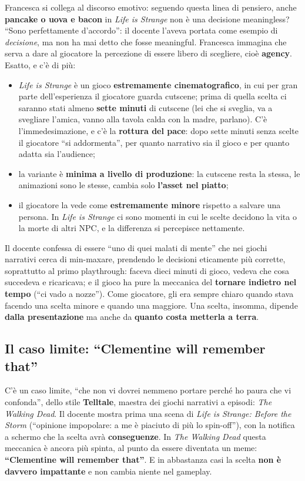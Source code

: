 Francesca si collega al discorso emotivo: seguendo questa linea di pensiero,
anche \textbf{pancake o uova e bacon} in \emph{Life is Strange} non è una
decisione meaningless? ``Sono perfettamente d'accordo'': il docente l'aveva
portata come esempio di \emph{decisione}, ma non ha mai detto che fosse
meaningful. Francesca immagina che serva a dare al giocatore la percezione di
essere libero di scegliere, cioè \textbf{agency}. Esatto, e c'è di più:
\begin{itemize}
  \item \emph{Life is Strange} è un gioco \textbf{estremamente
        cinematografico}, in cui per gran parte dell'esperienza il giocatore
        guarda cutscene; prima di quella scelta ci saranno stati almeno
        \textbf{sette minuti} di cutscene (lei che si sveglia, va a svegliare
        l'amica, vanno alla tavola calda con la madre, parlano). C'è
        l'immedesimazione, e c'è la \textbf{rottura del pace}: dopo sette
        minuti senza scelte il giocatore ``si addormenta'', per quanto
        narrativo sia il gioco e per quanto adatta sia l'audience;
  \item la variante è \textbf{minima a livello di produzione}: la cutscene
        resta la stessa, le animazioni sono le stesse, cambia solo
        \textbf{l'asset nel piatto};
  \item il giocatore la vede come \textbf{estremamente minore} rispetto a
        salvare una persona. In \emph{Life is Strange} ci sono momenti in
        cui le scelte decidono la vita o la morte di altri NPC, e la
        differenza si percepisce nettamente.
\end{itemize}
Il docente confessa di essere ``uno di quei malati di mente'' che nei giochi
narrativi cerca di min-maxare, prendendo le decisioni eticamente più
corrette, soprattutto al primo playthrough: faceva dieci minuti di gioco,
vedeva che cosa succedeva e ricaricava; e il gioco ha pure la meccanica del
\textbf{tornare indietro nel tempo} (``ci vado a nozze''). Come giocatore, gli
era sempre chiaro quando stava facendo una scelta minore e quando una
maggiore. Una scelta, insomma, dipende \textbf{dalla presentazione} ma anche
da \textbf{quanto costa metterla a terra}.

\subsection{Il caso limite: ``Clementine will remember that''}

C'è un caso limite, ``che non vi dovrei nemmeno portare perché ho paura che
vi confonda'', dello stile \textbf{Telltale}, maestra dei giochi narrativi a
episodi: \emph{The Walking Dead}. Il docente mostra prima una scena di
\emph{Life is Strange: Before the Storm} (``opinione impopolare: a me è
piaciuto di più lo spin-off''), con la notifica a schermo che la scelta avrà
\textbf{conseguenze}. In \emph{The Walking Dead} questa meccanica è ancora
più spinta, al punto da essere diventata un meme: \textbf{``Clementine will
remember that''}. E in abbastanza casi la scelta \textbf{non è davvero
impattante} e non cambia niente nel gameplay.

